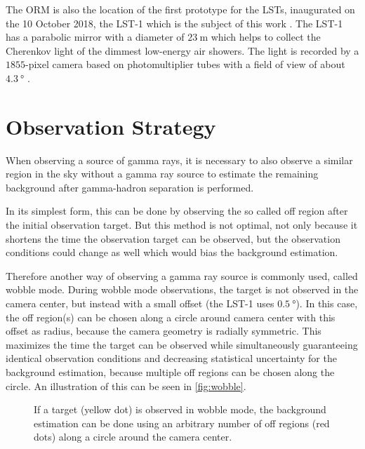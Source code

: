 The ORM is also the location of the first prototype for the LSTs, inaugurated on the 10 October 2018, the LST-1 which is the subject of this work \cite{lst_inauguration}.
The LST-1 has a parabolic mirror with a diameter of $\SI{23}{\meter}$ which helps to collect the Cherenkov light of the dimmest low-energy air showers.
The light is recorded by a $\num{1855}$-pixel camera based on photomultiplier tubes with a field of view of about $\SI{4.3}{\degree}$ \cite{cta-website}.


\section{Observation Strategy}
\label{sec:wobble}
When observing a source of gamma rays, it is necessary to also observe a similar region in the sky without a gamma ray source to estimate the 
remaining background after gamma-hadron separation is performed.

In its simplest form, this can be done by observing the so called off region after the initial observation target.
But this method is not optimal, not only because it shortens the time the observation target can be observed, but the observation conditions could
change as well which would bias the background estimation.

Therefore another way of observing a gamma ray source is commonly used, called wobble mode.
During wobble mode observations, the target is not observed in the camera center, but instead with a small offset (the LST-1 uses $\SI{0.5}{\degree}$).
In this case, the off region(s) can be chosen along a circle around camera center with this offset as radius, because the camera geometry is radially symmetric.
This maximizes the time the target can be observed while simultaneously guaranteeing identical observation conditions and decreasing statistical uncertainty 
for the background estimation, because multiple off regions can be chosen along the circle.
An illustration of this can be seen in \autoref{fig:wobble}.

\begin{figure}
    \centering
    \caption{If a target (yellow dot) is observed in wobble mode, the background estimation can be done using an arbitrary number of off regions 
        (red dots) along a circle around the camera center.
    }
    \label{fig:wobble}
\end{figure}

